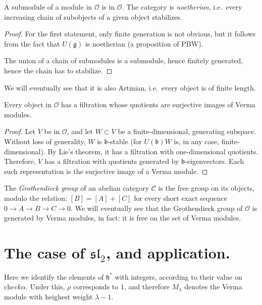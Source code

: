 \begin{lemma}
A submodule of a module in $\mathcal O$ is in $\mathcal O$. The category is \emph{noetherian}, i.e.\ every increasing chain of subobjects of a given object stabilizes.
\end{lemma}

\begin{proof}
For the first statement, only finite generation is not obvious, but it follows from the fact that $U(\mathfrak g)$ is noetherian (a proposition of PBW).

The union of a chain of submodules is a submodule, hence finitely generated, hence the chain has to stabilize.
\end{proof}

We will eventually see that it is also Artinian, i.e.\ every object is of finite length.

\begin{lemma}\label{filtrationVerma}
Every object in $\mathcal O$ has a filtration whose quotients are surjective images of Verma modules.
\end{lemma}

\begin{proof}
 Let $V$ be in $\mathcal O$, and let $W\subset V$ be a finite-dimensional, generating subspace. Without loss of generality, $W$ is $\mathfrak b$-stable (for $U(\mathfrak b)W$ is, in any case, finite-dimensional). By Lie's theorem, it has a filtration with one-dimensional quotients. Therefore, $V$ has a filtration with quotients generated by $\mathfrak b$-eigenvectors. Each such representation is the surjective image of a Verma module.
\end{proof}

The \emph{Grothendieck group} of an abelian category $\mathcal C$ is the free group on its objects, modulo the relation: $[B]=[A]+[C]$ for every short exact sequence $0\to A \to B\to C\to 0$. We will eventually see that the Grothendieck group of $\mathcal O$ is generated by Verma modules, in fact: it is free on the set of Verma modules.


\section{The case of $\mathfrak{sl}_2$, and application.}

Here we identify the elements of $\mathfrak h^*$ with integers, according to their value on $\text{ch}eck\alpha$. Under this, $\rho$ corresponds to $1$, and therefore $M_\lambda$ denotes the Verma module with heighest weight $\lambda-1$. 

